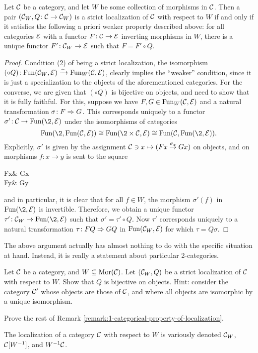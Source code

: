\begin{lemma}\label{lemma:1-strict-localization-is-2-strict-localization}
	Let \(\mathcal{C}\) be a category, and let \(W\) be some collection of morphisms in \(\mathcal{C}\). Then a pair \((\mathcal{C}_W,Q\!:\mathcal{C}\to\mathcal{C}_W)\) is a strict localization of \(\mathcal{C}\) with respect to \(W\) if and only if
	it satisfies the following a priori weaker property described above: for all categories \(\mathcal{E}\) with a functor \(F\!:\mathcal{C}\to\mathcal{E}\) inverting morphisms in \(W\), there is a unique functor \(F'\!:\mathcal{C}_W\to\mathcal{E}\)
	such that \(F = F'\circ Q\).
\end{lemma}
\begin{proof}
Condition (2) of being a strict localization, the isomorphism \((\circ Q)\!:\operatorname{Fun}(\mathcal{C}_W,\mathcal{E})\xrightarrow{\sim}\operatorname{Fun}_W(\mathcal{C},\mathcal{E})\), clearly implies the ``weaker'' condition, since it is just a specialization
to the objects of the aforementioned categories. For the converse, we are given that \((\circ Q)\) is bijective on objects, and need to show that it is fully faithful. For this, suppose we have
\(F,G\in\operatorname{Fun}_W(\mathcal{C},\mathcal{E})\) and a natural transformation \(\sigma\!:F\Rightarrow G\). This corresponds uniquely to a functor \(\sigma'\!:\calC\to\Fun(\2,\calE)\) under the isomorphisms of categories
\[ \Fun(\2,\Fun(\calC,\calE)) \cong \Fun(\2\times\calC,\calE)\cong\Fun(\calC,\Fun(\2,\calE)). \]
Explicitly, \(\sigma'\) is given by the assignment \(\mathcal{C}\ni x \mapsto (Fx\overset{\sigma_x}\to Gx) \) on objects, and on morphisms \(f\!:x\to y\) is sent to the square
\begin{diagram*}
	Fx\ar[r,"\sigma_x"]\ar[d,"F(f)"'] & Gx\ar[d,"G(f)"] \\
	Fy\ar[r,"\sigma_y"] & Gy
\end{diagram*}
and in particular, it is clear that for all \(f\in W\), the morphism \(\sigma'(f)\) in \(\Fun(\2,\calE)\) is invertible. Therefore, we obtain a unique functor \(\tau'\!:\calC_W\to\Fun(\2,\calE)\)
such that \(\sigma' = \tau'\circ Q\). Now \(\tau'\) corresponds uniquely to a natural transformation \(\tau\!:FQ\Rightarrow GQ\) in \(\operatorname{Fun}(\mathcal{C}_W,\mathcal{E})\) for which \(\tau = Q\sigma\).
\end{proof}
\begin{remark}
	The above argument actually has almost nothing to do with the specific situation at hand. Instead, it is really a statement about particular 2-categories.
\end{remark}
\begin{exercise}
	Let \(\mathcal{C}\) be a category, and \(W\subseteq\operatorname{Mor}(\mathcal{C})\). Let \((\mathcal{C}_W,Q)\) be a strict localization of \(\mathcal{C}\) with respect to \(W\). Show that \(Q\) is bijective on objects. Hint: consider the category
	\(\mathcal{C}'\) whose objects are those of \(\mathcal{C}\), and where all objects are isomorphic by a unique isomorphism.
\end{exercise}
\begin{exercise}
	Prove the rest of Remark \ref{remark:1-categorical-property-of-localization}.
\end{exercise}
\begin{notation}
	The localization of a category \(\mathcal{C}\) with respect to \(W\) is variously denoted \(\mathcal{C}_W\), \(\mathcal{C}[W^{-1}]\), and \(W^{-1}\mathcal{C}\).
\end{notation}

